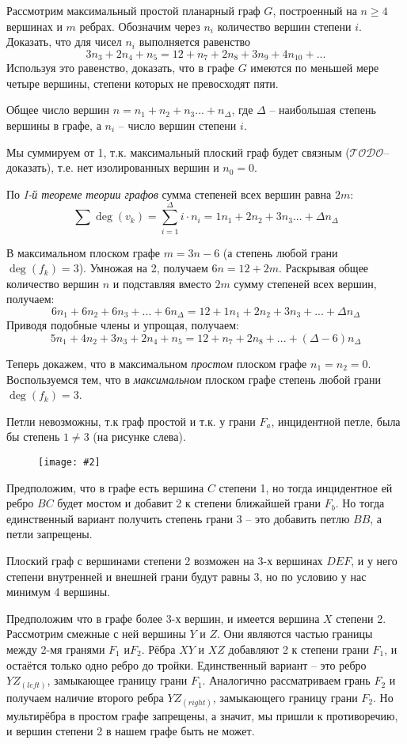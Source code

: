 \documentclass[a4paper,12pt]{article}
\numberwithin{figure}{section}
\def\TODO{\guillemotleft$\mathcal{TODO}$\guillemotright\textellipsis}
\newcommand\CenterFigure[2]{\begin{figure}[H]\centering\texttt{[image: \#2]}\end{figure}}
\begin{document}
\begin{problem}
	Рассмотрим максимальный простой планарный граф $G$, построенный на $n \geqslant 4$ вершинах и $m$ ребрах. Обозначим через $n_i$ количество вершин степени $i$. Доказать, что для чисел $n_i$ выполняется равенство
	\[ 3n_3+2n_4+n_5=12+n_7+2n_8+3n_9+4n_{10}+... \]
	Используя это равенство, доказать, что в графе $G$ имеются по меньшей мере четыре вершины, степени которых не превосходят пяти.
\end{problem}
\begin{solution}
	Общее число вершин
	$\displaystyle n=n_1+n_2+n_3...+n_{\Delta}$,
	где $\Delta$ -- наибольшая степень вершины в графе, а $n_i$ -- число вершин степени $i$.
	
	Мы суммируем от 1, т.к. максимальный плоский граф будет связным (\TODO -- доказать), т.е. нет изолированных вершин и $n_0=0$.
	
	По \textit{I-й теореме теории графов} сумма степеней всех вершин равна $2m$: \[ \sum{\deg(v_k)}=\sum_{i=1}^{\Delta}{i \cdot n_i}=1n_1+2n_2+3n_3...+\Delta n_{\Delta} \]
	
	В максимальном плоском графе $m=3n-6$ (а степень любой грани $\deg(f_k)=3$).
	Умножая на 2, получаем $6n=12+2m$.
	Раскрывая общее количество вершин $n$ и подставляя вместо $2m$ сумму степеней всех вершин, получаем:
	\[ 6n_1+6n_2+6n_3+...+6n_{\Delta} = 12+1n_1+2n_2+3n_3+...+\Delta n_{\Delta}\]
	Приводя подобные члены и упрощая, получаем:
	\[ 5n_1+4n_2+3n_3+2n_4+n_5 = 12+n_7+2n_8+...+(\Delta-6)n_{\Delta} \]

	Теперь докажем, что в максимальном \textit{простом} плоском графе $n_1=n_2=0$. Воспользуемся тем, что в \textit{максимальном} плоском графе степень любой грани $\deg(f_k)=3$.

	Петли невозможны, т.к граф простой и т.к. у грани $F_a$, инцидентной петле, была бы степень $1 \neq 3$ (на рисунке слева).
		\CenterFigure{9cm}{max-simple-flat-graph-cannot-have-deg-1-or-2.png}
	Предположим, что в графе есть вершина $C$ степени 1, но тогда инцидентное ей ребро $BC$ будет мостом и добавит 2 к степени ближайшей грани $F_b$. Но тогда единственный вариант получить степень грани 3 -- это добавить петлю $BB$, а петли запрещены.
	
	Плоский граф с вершинами степени 2 возможен на 3-х вершинах $DEF$, и у него степени внутренней и внешней грани будут равны 3, но по условию у нас минимум 4 вершины.
	
	Предположим что в графе более 3-х вершин, и имеется вершина $X$ степени 2. Рассмотрим смежные с ней вершины $Y$ и $Z$. Они являются частью границы между 2-мя гранями $F_1$ и$F_2$. Рёбра $XY$ и $XZ$ добавляют 2 к степени грани $F_1$, и остаётся только одно ребро до тройки. Единственный вариант -- это ребро $YZ_{(left)}$, замыкающее границу грани $F_1$. Аналогично рассматриваем грань $F_2$ и получаем наличие второго ребра $YZ_{(right)}$, замыкающего границу грани $F_2$. Но мультирёбра в простом графе запрещены, а значит, мы пришли к противоречию, и вершин степени 2 в нашем графе быть не может.


\end{solution}
\end{document}
